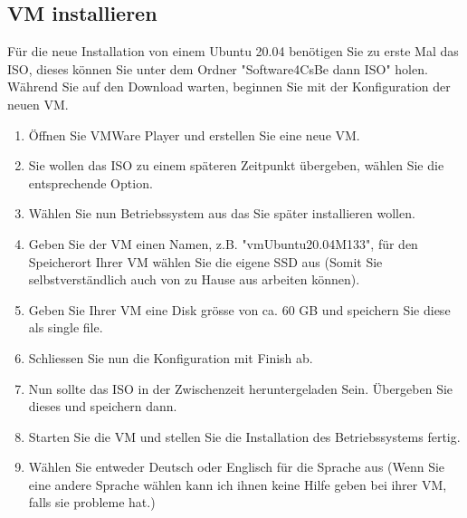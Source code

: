 \subsection{VM installieren}\label{subsec:vminstallieren}
\begin{frame}[fragile]
    Für die neue Installation von einem Ubuntu 20.04 benötigen Sie zu erste Mal das ISO, dieses können Sie
    unter dem Ordner "Software4CsBe dann ISO" holen.
    Während Sie auf den Download warten, beginnen Sie mit der Konfiguration der neuen VM.
\end{frame}

\begin{frame}[fragile]
    \begin{enumerate}
        \item Öffnen Sie VMWare Player und erstellen Sie eine neue VM.
        \item Sie wollen das ISO zu einem späteren Zeitpunkt übergeben, wählen Sie die entsprechende Option.
        \item Wählen Sie nun Betriebssystem aus das Sie später installieren wollen.
        \item Geben Sie der VM einen Namen, z.B. "vmUbuntu20.04\textunderscore M133", für den Speicherort Ihrer VM wählen Sie die eigene
        SSD aus (Somit Sie selbstverständlich auch von zu Hause aus arbeiten können).
         \newpage
        \item Geben Sie Ihrer VM eine Disk grösse von ca. 60 GB und speichern Sie diese als single file.
        \item Schliessen Sie nun die Konfiguration mit Finish ab.
        \item Nun sollte das ISO in der Zwischenzeit heruntergeladen Sein.
        Übergeben Sie dieses und speichern dann.
        \item Starten Sie die VM und stellen Sie die Installation des Betriebssystems fertig.
        \item Wählen Sie entweder Deutsch oder Englisch für die Sprache aus (Wenn Sie eine andere Sprache wählen kann ich ihnen keine Hilfe geben bei ihrer VM, falls sie probleme hat.)

\end{enumerate}
\end{frame}

